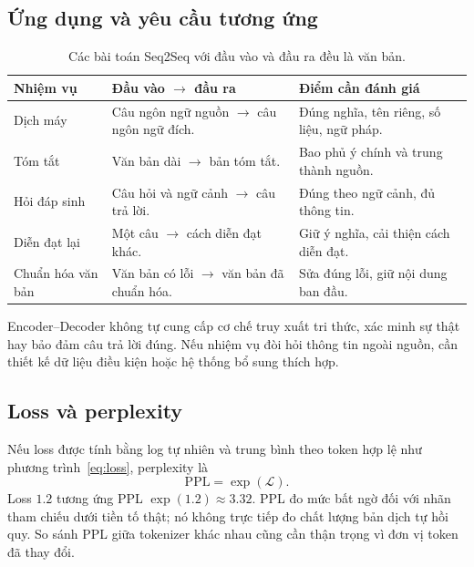 \documentclass[11pt,a4paper]{article}
\numberwithin{equation}{section}
\begin{document}
\subsection{Ứng dụng và yêu cầu tương ứng}
\begin{table}[H]
\centering\small
\begin{tabularx}{\linewidth}{@{}p{2.8cm}YY@{}}
\toprule{}Nhiệm vụ & Đầu vào $\rightarrow$ đầu ra & Điểm cần đánh giá\\\midrule
Dịch máy & Câu ngôn ngữ nguồn $\rightarrow$ câu ngôn ngữ đích. & Đúng nghĩa, tên riêng, số liệu, ngữ pháp.\\
Tóm tắt & Văn bản dài $\rightarrow$ bản tóm tắt. & Bao phủ ý chính và trung thành nguồn.\\
Hỏi đáp sinh & Câu hỏi và ngữ cảnh $\rightarrow$ câu trả lời. & Đúng theo ngữ cảnh, đủ thông tin.\\
Diễn đạt lại & Một câu $\rightarrow$ cách diễn đạt khác. & Giữ ý nghĩa, cải thiện cách diễn đạt.\\
Chuẩn hóa văn bản & Văn bản có lỗi $\rightarrow$ văn bản đã chuẩn hóa. & Sửa đúng lỗi, giữ nội dung ban đầu.\\
\bottomrule
\end{tabularx}
\caption{Các bài toán Seq2Seq với đầu vào và đầu ra đều là văn bản.}
\end{table}
Encoder--Decoder không tự cung cấp cơ chế truy xuất tri thức, xác minh sự thật hay bảo đảm câu trả lời đúng. Nếu nhiệm vụ đòi hỏi thông tin ngoài nguồn, cần thiết kế dữ liệu điều kiện hoặc hệ thống bổ sung thích hợp.

\subsection{Loss và perplexity}
Nếu loss được tính bằng log tự nhiên và trung bình theo token hợp lệ như phương trình~\eqref{eq:loss}, perplexity là
\begin{equation}
\mathrm{PPL}=\exp(\mathcal L).
\end{equation}
Loss $1.2$ tương ứng PPL $\exp(1.2)\approx3.32$. PPL đo mức bất ngờ đối với nhãn tham chiếu dưới tiền tố thật; nó không trực tiếp đo chất lượng bản dịch tự hồi quy. So sánh PPL giữa tokenizer khác nhau cũng cần thận trọng vì đơn vị token đã thay đổi.
\end{document}
